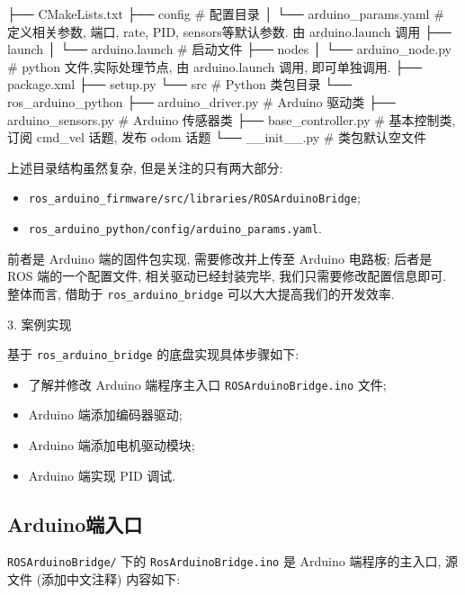 \documentclass[openany, fontset=windowsold]{ctexbook}
\theoremstyle{kaiti}
\theoremstyle{normal}
\begin{document}
\begin{bash}
      ├── CMakeLists.txt
      ├── config                              # 配置目录
      │   └── arduino_params.yaml             # 定义相关参数, 端口, rate, PID, sensors等默认参数. 由 arduino.launch 调用
      ├── launch
      │   └── arduino.launch                  # 启动文件
      ├── nodes
      │   └── arduino_node.py                 # python 文件,实际处理节点, 由 arduino.launch 调用, 即可单独调用.
      ├── package.xml
      ├── setup.py
      └── src                                 # Python 类包目录
          └── ros_arduino_python
              ├── arduino_driver.py           # Arduino 驱动类
              ├── arduino_sensors.py          # Arduino 传感器类
              ├── base_controller.py          # 基本控制类, 订阅 cmd_vel 话题, 发布 odom 话题
              └── __init__.py                 # 类包默认空文件
\end{bash}

上述目录结构虽然复杂, 但是关注的只有两大部分:

\begin{itemize}
  \item \verb|ros_arduino_firmware/src/libraries/ROSArduinoBridge|;
  \item \verb|ros_arduino_python/config/arduino_params.yaml|.
\end{itemize}

前者是 Arduino 端的固件包实现, 需要修改并上传至 Arduino 电路板; 后者是 ROS 端的一个配置文件, 相关驱动已经封装完毕, 我们只需要修改配置信息即可. 整体而言, 借助于 \verb|ros_arduino_bridge| 可以大大提高我们的开发效率.

3. 案例实现

基于 \verb|ros_arduino_bridge| 的底盘实现具体步骤如下:

\begin{itemize}
  \item 了解并修改 Arduino 端程序主入口 \verb|ROSArduinoBridge.ino| 文件; 
  \item Arduino 端添加编码器驱动; 
  \item Arduino 端添加电机驱动模块; 
  \item Arduino 端实现 PID 调试.
\end{itemize}

\subsection{Arduino端入口}

\verb|ROSArduinoBridge/| 下的 \verb|RosArduinoBridge.ino| 是 Arduino 端程序的主入口, 源文件 (添加中文注释) 内容如下:
\end{document}
